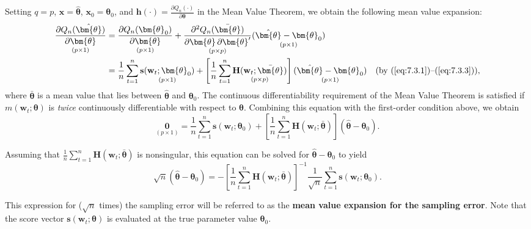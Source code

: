 \medskip
Setting $q = p$, $\mathbf{x} = \hat{\bm{\theta}}$, $\mathbf{x}_0 = \bm{\theta}_0$, and $\mathbf{h}(\cdot) = \frac{\partial Q_n(\cdot)}{\partial \bm{\theta}}$ in the Mean Value Theorem, we obtain the following mean value expansion:
\begin{equation}
\label{eq:7.3.5}
\begin{split}
\underset{(p \times 1)}{\frac{\partial Q_n(\hat{\bm{\theta}})}{\partial \bm{\theta}}} &= \underset{(p \times 1)}{\frac{\partial Q_n(\bm{\theta}_0)}{\partial \bm{\theta}}} + \underset{(p \times p)}{\frac{\partial^2 Q_n(\bar{\bm{\theta}})}{\partial \bm{\theta} \, \partial \bm{\theta}'}} \underset{(p \times 1)}{(\hat{\bm{\theta}} - \bm{\theta}_0)} \\
&= \frac{1}{n} \sum_{t=1}^{n} \underset{(p \times 1)}{\mathbf{s}(\mathbf{w}_t; \bm{\theta}_0)} + \left[ \frac{1}{n} \sum_{t=1}^{n} \underset{(p \times p)}{\mathbf{H}(\mathbf{w}_t; \bar{\bm{\theta}})} \right] \underset{(p \times 1)}{(\hat{\bm{\theta}} - \bm{\theta}_0)} \quad (\text{by } (\ref{eq:7.3.1})\text{--}(\ref{eq:7.3.3})),
\end{split}
\end{equation}
where $\bar{\bm{\theta}}$ is a mean value that lies between $\hat{\bm{\theta}}$ and $\bm{\theta}_0$. The continuous differentiability requirement of the Mean Value Theorem is satisfied if $m(\mathbf{w}_t; \bm{\theta})$ is \emph{twice} continuously differentiable with respect to $\bm{\theta}$. Combining this equation with the first-order condition above, we obtain
\begin{equation}
\label{eq:7.3.6}
\underset{(p \times 1)}{\mathbf{0}} = \frac{1}{n} \sum_{t=1}^{n} \mathbf{s}(\mathbf{w}_t; \bm{\theta}_0) + \left[ \frac{1}{n} \sum_{t=1}^{n} \mathbf{H}(\mathbf{w}_t; \bar{\bm{\theta}}) \right] (\hat{\bm{\theta}} - \bm{\theta}_0).
\end{equation}

Assuming that $\frac{1}{n}\sum_{t=1}^{n}\mathbf{H}(\mathbf{w}_t; \bar{\bm{\theta}})$ is nonsingular, this equation can be solved for $\hat{\bm{\theta}} - \bm{\theta}_0$ to yield
\begin{equation}
\label{eq:7.3.7}
\sqrt{n}(\hat{\bm{\theta}} - \bm{\theta}_0) = -\left[ \frac{1}{n} \sum_{t=1}^{n} \mathbf{H}(\mathbf{w}_t; \bar{\bm{\theta}}) \right]^{-1} \frac{1}{\sqrt{n}} \sum_{t=1}^{n} \mathbf{s}(\mathbf{w}_t; \bm{\theta}_0).
\end{equation}

This expression for ($\sqrt{n}$ times) the sampling error will be referred to as the \textbf{mean value expansion for the sampling error}. Note that the score vector $\mathbf{s}(\mathbf{w}_t; \bm{\theta})$ is evaluated at the true parameter value $\bm{\theta}_0$.

